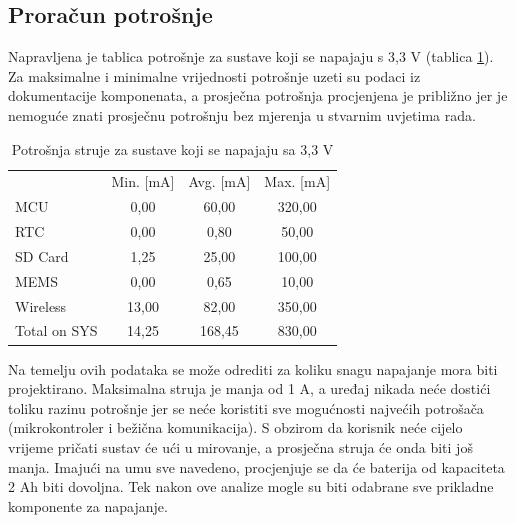 \subsection{Proračun potrošnje}
Napravljena je tablica potrošnje za sustave koji se napajaju s 3,3 V (tablica \ref{tab:MB3V3}). Za maksimalne i minimalne vrijednosti potrošnje uzeti su podaci iz dokumentacije komponenata, a prosječna potrošnja procjenjena je približno jer je nemoguće znati prosječnu potrošnju bez mjerenja u stvarnim uvjetima rada.
\begin{table}[htbp]
    \centering
    \caption{Potrošnja struje za sustave koji se napajaju sa 3,3 V}
    \begin{tabular}{lccc} \hline
           & Min. [mA] & Avg. [mA] & Max. [mA] \\
      MCU  & 0,00 & 60,00 & 320,00 \\
      RTC  & 0,00 & 0,80 & 50,00 \\
      SD Card & 1,25 & 25,00 & 100,00 \\
      MEMS & 0,00 & 0,65 & 10,00 \\
      Wireless & 13,00 & 82,00 & 350,00 \\ \hline
      Total on SYS & 14,25 & 168,45 & 830,00 \\ \hline
    \end{tabular}%
    \label{tab:MB3V3}%
\end{table}%
Na temelju ovih podataka se može odrediti za koliku snagu napajanje mora biti projektirano. Maksimalna struja je manja od 1 A, a uređaj nikada neće dostići toliku razinu potrošnje jer se neće koristiti sve mogućnosti najvećih potrošača (mikrokontroler i bežična komunikacija). S obzirom da korisnik neće cijelo vrijeme pričati sustav će ući u mirovanje, a prosječna struja će onda biti još manja. Imajući na umu sve navedeno, procjenjuje se da će baterija od kapaciteta 2 Ah biti dovoljna. Tek nakon ove analize mogle su biti odabrane sve prikladne komponente za napajanje.


